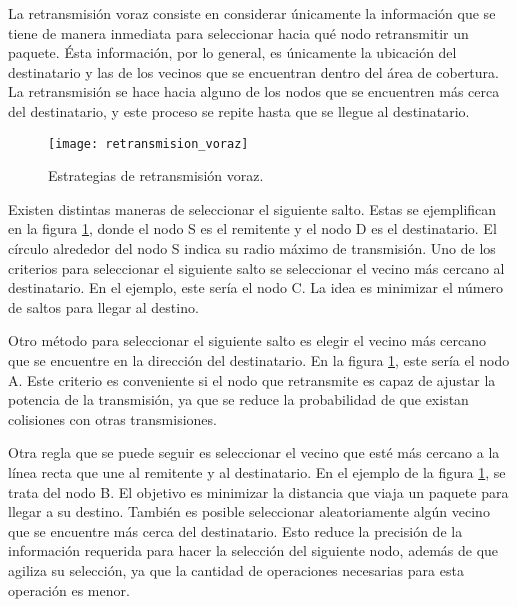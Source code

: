 La retransmisión voraz consiste en considerar únicamente la información que se
tiene de manera inmediata para seleccionar hacia qué nodo retransmitir un
paquete. Ésta información, por lo general, es únicamente la ubicación del
destinatario y las de los vecinos que se encuentran dentro del área de cobertura. La
retransmisión se hace hacia alguno de los nodos que se encuentren más cerca del
destinatario, y este proceso se repite hasta que se llegue al destinatario.

\begin{figure}[th]
\centering
\texttt{[image: retransmision\_voraz]}
\decoRule
\caption[Estrategias de retransmisión voraz]{Estrategias de retransmisión
voraz\protect\footnotemark.}
\label{fig:retransmision_voraz}
\end{figure}


Existen distintas maneras de seleccionar el siguiente salto. Estas se
ejemplifican en la figura \ref{fig:retransmision_voraz}, donde el nodo S es
el remitente y el nodo D es el destinatario. El círculo alrededor del nodo S
indica su radio máximo de transmisión. Uno de los criterios para seleccionar el
siguiente salto se seleccionar el vecino más cercano al destinatario. En el
ejemplo, este sería el nodo C. La idea es minimizar el número de saltos para
llegar al destino.

Otro método para seleccionar el siguiente salto es elegir el vecino más cercano
que se encuentre en la dirección del destinatario. En la figura
\ref{fig:retransmision_voraz}, este sería el nodo A. Este criterio es
conveniente si el nodo que retransmite es capaz de ajustar la potencia de la
transmisión, ya que se reduce la probabilidad de que existan colisiones con
otras transmisiones.

Otra regla que se puede seguir es seleccionar el vecino que esté más cercano a
la línea recta que une al remitente y al destinatario. En el ejemplo de la
figura \ref{fig:retransmision_voraz}, se trata del nodo B. El objetivo es
minimizar la distancia que viaja un paquete para llegar a su destino. También
es posible seleccionar aleatoriamente algún vecino que se encuentre más cerca
del destinatario. Esto reduce la precisión de la información requerida para
hacer la selección del siguiente nodo, además de que agiliza su selección, ya
que la cantidad de operaciones necesarias para esta operación es menor.

